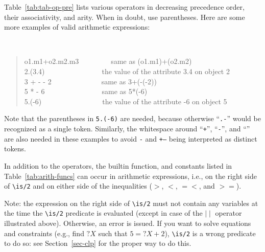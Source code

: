 \documentclass[11pt]{article}
\newcommand{\bs}{\textbackslash}
\begin{document}
Table~\ref{tab:tab-op-pre} lists various operators in decreasing precedence
order, their associativity, and arity.  When in doubt, use parentheses.
Here are some more examples of valid arithmetic expressions:
{\tt
\begin{quote}
o1.m1+o2.m2.m3~~~~~~~~~{\rm same as} (o1.m1)+(o2.m2)\\
2.(3.4)~~~~~~~~~~~~~~~~{\rm the value of the attribute} 3.4 {\rm on object} 2\\
3 + - - 2~~~~~~~~~~~~~~{\rm same as} 3+(-(-2))\\
5 * - 6~~~~~~~~~~~~~~~~{\rm same as} 5*(-6)\\
5.(-6)~~~~~~~~~~~~~~~~~{\rm the value of the attribute} -6 {\rm on object} 5
\end{quote}
}
Note that the parentheses in {\tt 5.(-6)} are needed,
because otherwise ``{\tt .-}'' would be recognized as a single token.
Similarly, the whitespace around ``{\tt +}'', ``{\tt -}'', and ``{\tt *}''
are also needed in these examples to avoid {\tt *-} and {\tt +--} being
interpreted as distinct tokens.

\ifdef{\isfloraman}{}
{
  
}


In addition to the operators, the builtin function, and constants
listed in Table~\ref{tab:arith-funcs}
can occur in arithmetic expressions, i.e., on the right side of
\texttt{\bs{}is/2}
 and on either side of the inequalities ($>$, $<$, $=<$, and $>=$).

\noindent
Note: the expression on the right side of \texttt{\bs{}is/2} must not
contain any variables at the time the \texttt{\bs{}is/2} predicate is
{
  evaluated (except in case of the $\mid\mid$ operator illustrated above).
}
Otherwise, an error is issued. If you want to solve equations and
constraints (e.g., find $?X$ such that $5 = ?X+2$), \texttt{\bs{}is/2} is a wrong predicate to do so: see
Section~\ref{sec-clp} for the proper way to do this.
\end{document}
